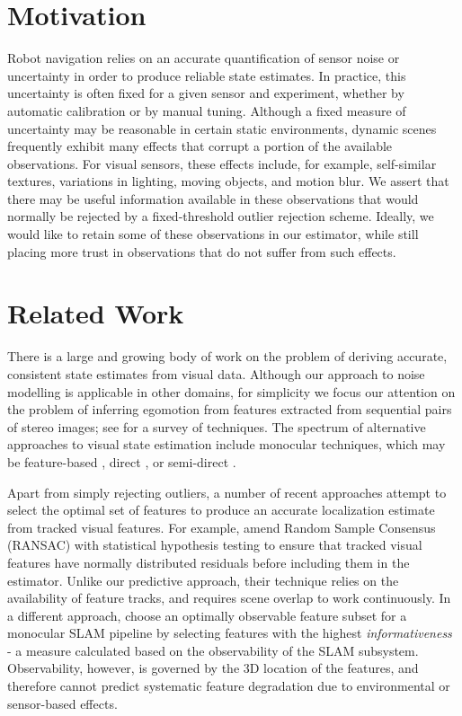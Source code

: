 \section{Motivation}

Robot navigation relies on an accurate quantification of sensor noise or uncertainty in order to produce reliable state estimates.
In practice, this uncertainty is often fixed for a given sensor and experiment, whether by automatic calibration or by manual tuning.
Although a fixed measure of uncertainty may be reasonable in certain static environments, dynamic scenes frequently exhibit many effects that corrupt a portion of the available observations.
For visual sensors, these effects include, for example, self-similar textures, variations in lighting, moving objects, and motion blur. 
We assert that there may be useful information available in these observations that would normally be rejected by a fixed-threshold outlier rejection scheme. 
Ideally, we would like to retain some of these observations in our estimator, while still placing more trust in observations that do not suffer from such effects.

\section{Related Work}


There is a large and growing body of work on the problem of deriving accurate,
consistent state estimates from visual data.  Although our approach to noise
modelling is applicable in other domains, for simplicity we focus our attention
on the problem of inferring egomotion from features extracted from sequential
pairs of stereo images; see \citet{sunderhauf2007stereo} for a survey of
techniques. The spectrum of alternative approaches to visual state estimation
include monocular techniques, which may be feature-based
\citep{scaramuzza2011visual}, direct \citep{irani2000direct}, or semi-direct
\citep{forster2014svo}. 

Apart from simply rejecting outliers, a number of recent approaches attempt to
select the optimal set of features to produce an accurate localization estimate
from tracked visual features. For example, \citet{Tsotsos2015} amend Random
Sample Consensus (RANSAC) with statistical hypothesis testing to ensure that tracked visual features have normally distributed residuals before including them in
the estimator. Unlike our predictive approach, their technique relies on the availability of feature tracks, and requires scene overlap to work continuously. In a different
approach,  choose an optimally observable feature subset for a
monocular SLAM pipeline by selecting features with the highest \textit{informativeness} - a measure calculated based on the observability of the SLAM subsystem. Observability, however, is governed by the 3D location of the features, and therefore cannot predict systematic feature degradation due to environmental or sensor-based effects. 


